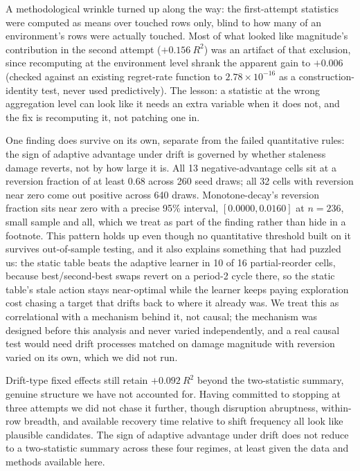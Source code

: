 \documentclass[conference]{IEEEtran}
\begin{document}
A methodological wrinkle turned up along the way: the first-attempt
statistics were computed as means over touched rows only, blind to how
many of an environment's rows were actually touched. Most of what looked
like magnitude's contribution in the second attempt ($+0.156\ R^2$) was
an artifact of that exclusion, since recomputing at the environment level
shrank the apparent gain to $+0.006$ (checked against an existing
regret-rate function to $2.78 \times 10^{-16}$ as a construction-identity
test, never used predictively). The lesson: a statistic at the wrong
aggregation level can look like it needs an extra variable when it does
not, and the fix is recomputing it, not patching one in.

One finding does survive on its own, separate from the failed
quantitative rules: the sign of adaptive advantage under drift is
governed by whether staleness damage reverts, not by how large it is. All
13 negative-advantage cells sit at a reversion fraction of at least 0.68
across 260 seed draws; all 32 cells with reversion near zero come out
positive across 640 draws. Monotone-decay's reversion fraction sits near
zero with a precise 95\% interval, $[0.0000, 0.0160]$ at $n=236$, small
sample and all, which we treat as part of the finding rather than hide in
a footnote. This pattern holds up even though no quantitative threshold
built on it survives out-of-sample testing, and it also explains
something that had puzzled us: the static table beats the adaptive
learner in 10 of 16 partial-reorder cells, because best/second-best swaps
revert on a period-2 cycle there, so the static table's stale action
stays near-optimal while the learner keeps paying exploration cost
chasing a target that drifts back to where it already was. We treat this
as correlational with a mechanism behind it, not causal; the mechanism
was designed before this analysis and never varied independently, and a
real causal test would need drift processes matched on damage magnitude
with reversion varied on its own, which we did not run.

Drift-type fixed effects still retain $+0.092\ R^2$ beyond the
two-statistic summary, genuine structure we have not accounted for.
Having committed to stopping at three attempts we did not chase it
further, though disruption abruptness, within-row breadth, and available
recovery time relative to shift frequency all look like plausible
candidates. The sign of adaptive advantage under drift does not reduce to
a two-statistic summary across these four regimes, at least given the
data and methods available here.
\end{document}
